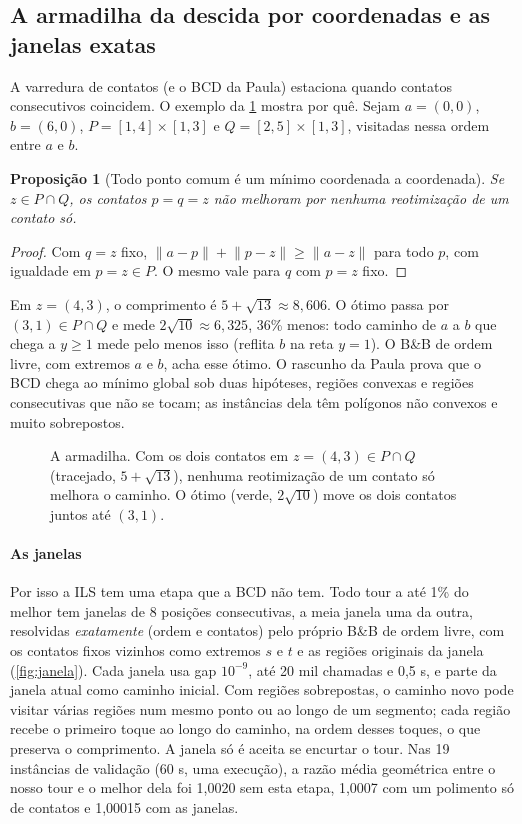 \documentclass[11pt,a4paper]{article}
\theoremstyle{plain}\newtheorem{proposicao}{Proposição}
\theoremstyle{definition}\newtheorem{definicao}{Definição}
\theoremstyle{plain}\newtheorem{teorema}{Teorema}
\theoremstyle{plain}\newtheorem{lema}{Lema}
\newcommand{\norm}[1]{\lVert#1\rVert}
\begin{document}
\subsection{A armadilha da descida por coordenadas e as janelas exatas}\label{sec:janelas}
A varredura de contatos (e o BCD da Paula) estaciona quando contatos consecutivos coincidem. O exemplo da \cref{fig:armadilha} mostra por quê. Sejam \(a=(0,0)\), \(b=(6,0)\), \(P=[1,4]\times[1,3]\) e \(Q=[2,5]\times[1,3]\), visitadas nessa ordem entre \(a\) e \(b\).

\begin{proposicao}[Todo ponto comum é um mínimo coordenada a coordenada]\label{prop:armadilha}
Se \(z\in P\cap Q\), os contatos \(p=q=z\) não melhoram por nenhuma reotimização de um contato só.
\end{proposicao}
\begin{proof}
Com \(q=z\) fixo, \(\norm{a-p}+\norm{p-z}\ge\norm{a-z}\) para todo \(p\), com igualdade em \(p=z\in P\). O mesmo vale para \(q\) com \(p=z\) fixo.
\end{proof}
Em \(z=(4,3)\), o comprimento é \(5+\sqrt{13}\approx8{,}606\). O ótimo passa por \((3,1)\in P\cap Q\) e mede \(2\sqrt{10}\approx6{,}325\), 36\% menos: todo caminho de \(a\) a \(b\) que chega a \(y\ge1\) mede pelo menos isso (reflita \(b\) na reta \(y=1\)). O B\&B de ordem livre, com extremos \(a\) e \(b\), acha esse ótimo. O rascunho da Paula prova que o BCD chega ao mínimo global sob duas hipóteses, regiões convexas e regiões consecutivas que não se tocam; as instâncias dela têm polígonos não convexos e muito sobrepostos.

\begin{figure}[ht]\centering\figarmadilha
\caption{A armadilha. Com os dois contatos em \(z=(4,3)\in P\cap Q\) (tracejado, \(5+\sqrt{13}\)), nenhuma reotimização de um contato só melhora o caminho. O ótimo (verde, \(2\sqrt{10}\)) move os dois contatos juntos até \((3,1)\).}\label{fig:armadilha}
\end{figure}

\paragraph{As janelas} Por isso a ILS tem uma etapa que a BCD não tem. Todo tour a até 1\% do melhor tem janelas de 8 posições consecutivas, a meia janela uma da outra, resolvidas \emph{exatamente} (ordem e contatos) pelo próprio B\&B de ordem livre, com os contatos fixos vizinhos como extremos \(s\) e \(t\) e as regiões originais da janela (\cref{fig:janela}). Cada janela usa gap \(10^{-9}\), até 20 mil chamadas e 0,5 s, e parte da janela atual como caminho inicial. Com regiões sobrepostas, o caminho novo pode visitar várias regiões num mesmo ponto ou ao longo de um segmento; cada região recebe o primeiro toque ao longo do caminho, na ordem desses toques, o que preserva o comprimento. A janela só é aceita se encurtar o tour. Nas 19 instâncias de validação (60 s, uma execução), a razão média geométrica entre o nosso tour e o melhor dela foi 1,0020 sem esta etapa, 1,0007 com um polimento só de contatos e 1,00015 com as janelas.
\end{document}
